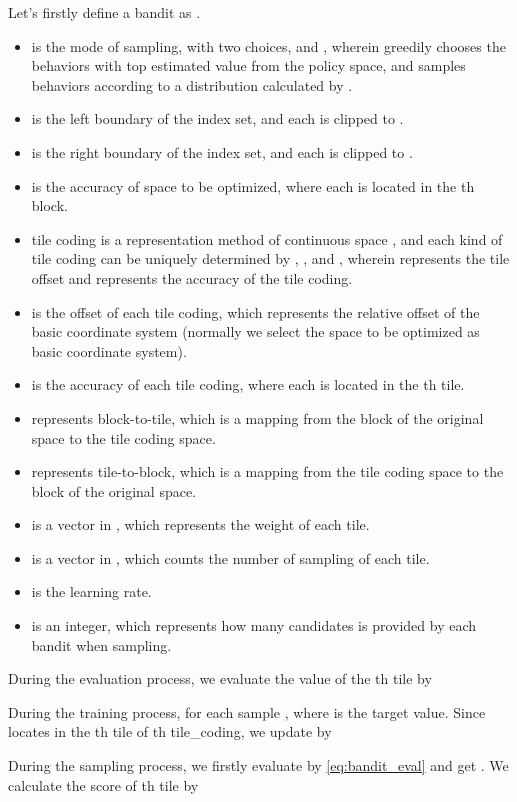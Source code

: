 \documentclass[nohyperref]{article}
\theoremstyle{plain}
\begin{document}
Let's firstly define a bandit as .
\begin{itemize}
    \item  is the mode of sampling, with two choices,  and , wherein  greedily chooses the behaviors with top estimated value from the policy space, and  samples behaviors according to a distribution calculated by .
    \item  is the left boundary of the index set, and each  is clipped to .
    \item  is the right boundary of the index set, and each  is clipped to .
    \item  is the accuracy of space to be optimized, where each  is located in the th block.
    \item tile coding is a representation method of continuous space \citep{sutton}, and each kind of tile coding can be uniquely determined by , ,  and , wherein  represents the tile offset and  represents the accuracy of the tile coding.
    \item  is the offset of each tile coding, which represents the relative offset of the basic coordinate system (normally we select the space to be optimized as basic coordinate system).
    \item  is the accuracy of each tile coding, where each  is located in the th tile.
    \item  represents block-to-tile, which is a mapping from the block of the original space to the tile coding space.
    \item  represents tile-to-block, which is a mapping from the tile coding space to the block of the original space.
    \item  is a vector in , which represents the weight of each tile.
    \item  is a vector in , which counts the number of sampling of each tile.
    \item  is the learning rate.
    \item  is an integer, which represents how many candidates is provided by each bandit when sampling.
\end{itemize}

During the evaluation process, we evaluate the value of the th tile by




During the training process, for each sample , where  is the target value. Since  locates in the th tile of th tile\_coding, we update  by


During the sampling process, we firstly evaluate  by \eqref{eq:bandit_eval} and get .
We calculate the score of th tile by
\end{document}
